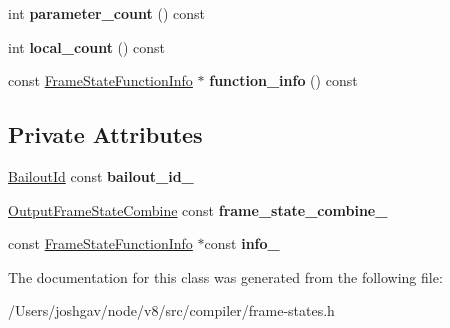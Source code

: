 \begin{DoxyCompactItemize}
\item 
int {\bfseries parameter\+\_\+count} () const \hypertarget{classv8_1_1internal_1_1compiler_1_1_frame_state_info_aabe320a7374fb9d89d1b0bd63c5246c0}{}\label{classv8_1_1internal_1_1compiler_1_1_frame_state_info_aabe320a7374fb9d89d1b0bd63c5246c0}

\item 
int {\bfseries local\+\_\+count} () const \hypertarget{classv8_1_1internal_1_1compiler_1_1_frame_state_info_addcab70f7a00fa6572f22ebbea7b4046}{}\label{classv8_1_1internal_1_1compiler_1_1_frame_state_info_addcab70f7a00fa6572f22ebbea7b4046}

\item 
const \hyperlink{classv8_1_1internal_1_1compiler_1_1_frame_state_function_info}{Frame\+State\+Function\+Info} $\ast$ {\bfseries function\+\_\+info} () const \hypertarget{classv8_1_1internal_1_1compiler_1_1_frame_state_info_a4a57c998d49b0a574d3852777ac700c7}{}\label{classv8_1_1internal_1_1compiler_1_1_frame_state_info_a4a57c998d49b0a574d3852777ac700c7}

\end{DoxyCompactItemize}
\subsection*{Private Attributes}
\begin{DoxyCompactItemize}
\item 
\hyperlink{classv8_1_1internal_1_1_bailout_id}{Bailout\+Id} const {\bfseries bailout\+\_\+id\+\_\+}\hypertarget{classv8_1_1internal_1_1compiler_1_1_frame_state_info_a931c589051a04065b16c6aa7279b7757}{}\label{classv8_1_1internal_1_1compiler_1_1_frame_state_info_a931c589051a04065b16c6aa7279b7757}

\item 
\hyperlink{classv8_1_1internal_1_1compiler_1_1_output_frame_state_combine}{Output\+Frame\+State\+Combine} const {\bfseries frame\+\_\+state\+\_\+combine\+\_\+}\hypertarget{classv8_1_1internal_1_1compiler_1_1_frame_state_info_a8bb8bd2cc859db93a3684010cc970bd4}{}\label{classv8_1_1internal_1_1compiler_1_1_frame_state_info_a8bb8bd2cc859db93a3684010cc970bd4}

\item 
const \hyperlink{classv8_1_1internal_1_1compiler_1_1_frame_state_function_info}{Frame\+State\+Function\+Info} $\ast$const {\bfseries info\+\_\+}\hypertarget{classv8_1_1internal_1_1compiler_1_1_frame_state_info_a77b353187d3caa4bc44a05d4127c7ef8}{}\label{classv8_1_1internal_1_1compiler_1_1_frame_state_info_a77b353187d3caa4bc44a05d4127c7ef8}

\end{DoxyCompactItemize}


The documentation for this class was generated from the following file\+:\begin{DoxyCompactItemize}
\item 
/\+Users/joshgav/node/v8/src/compiler/frame-\/states.\+h\end{DoxyCompactItemize}
